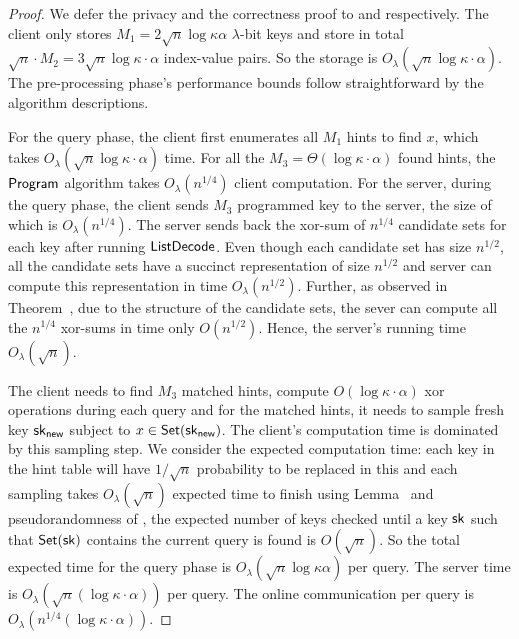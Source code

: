 \begin{proof}
    We defer the privacy and the correctness proof to
and 
respectively.
    The client only stores $M_1=2\sqrt{n}\log \kappa\alpha$
    $\lambda$-bit keys and store in total $\sqrt{n}\cdot M_2=3\sqrt{n}\log
    \kappa\cdot \alpha$ index-value pairs. So the storage is
    $O_\lambda(\sqrt{n}\log \kappa \cdot \alpha)$.
    The pre-processing phase's performance bounds follow straightforward by the algorithm descriptions.
    
    For the query phase, the client first enumerates all $M_1$ hints to find
    $x$, which takes $O_\lambda(\sqrt{n}\log \kappa\cdot \alpha)$ time. For all
    the $M_3=\Theta(\log \kappa \cdot \alpha)$ found hints, the
    $\mathsf{Program}$ algorithm takes $O_{\lambda}(n^{1/4})$ client computation. For the server, during the query phase, the client sends $M_3$ programmed \ppps key to the server, the size of which is $O_\lambda(n^{1/4})$. The server sends back the xor-sum of $n^{1/4}$ candidate sets for each key after running $\mathsf{ListDecode}$. Even though each candidate set has size $n^{1/2}$, all the candidate sets have a succinct representation of size $n^{1/2}$ and server can compute this representation in time $O_\lambda(n^{1/2})$. Further, as observed in Theorem~, due to the structure of the candidate sets, the sever can compute all the $n^{1/4}$ xor-sums in time only $O(n^{1/2})$. Hence, the server's running time %
    $O_{\lambda}(\sqrt{n})$. 
    
    The client needs to find $M_3$ matched hints, compute $O(\log \kappa \cdot \alpha)$ xor operations during each query and for the matched hints, it needs to sample fresh \ppps key $\mathsf{sk}_{\mathsf{new}}$ subject to $x\in \mathsf{Set}(\mathsf{sk}_{\mathsf{new}})$. The client's computation time is dominated by this sampling step. We consider the expected computation time: each key in the hint table will have $1/\sqrt{n}$ probability to be replaced in this and each sampling takes $O_\lambda(\sqrt{n})$ expected time to finish using Lemma~ and pseudorandomness of \ppps, the expected number of keys checked until a key $\mathsf{sk}$ such that $\mathsf{Set}(\mathsf{sk})$ contains the current query is found is $O(\sqrt{n})$.
    So the total expected time for the query phase is $O_\lambda(\sqrt{n}\log \kappa
    \alpha)$  per query. The server time is
    $O_\lambda(\sqrt{n}(\log \kappa \cdot\alpha))$ per query. The online
    communication per query is $O_\lambda( n^{1/4}(\log \kappa
    \cdot \alpha))$.
\end{proof}


